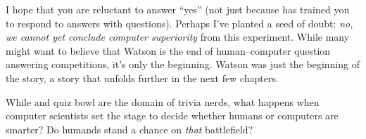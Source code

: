 I hope that you are reluctant to answer ``yes'' (not just
because \jeopardy{} has trained you to respond to answers with
questions).
%
Perhaps I've planted a seed of doubt: \emph{no, we cannot yet conclude
  computer superiority} from this experiment.
%
While many might want to believe that Watson is the end of
human--computer question answering competitions, it's only the
beginning.
%
Watson was just the beginning of the story, a story that unfolds
further in the next few chapters.

While \jeopardy{} and quiz bowl are the domain of trivia nerds, what
happens when computer scientists set the stage to decide whether
humans or computers are smarter?
%
Do humands stand a chance on \emph{that} battlefield?